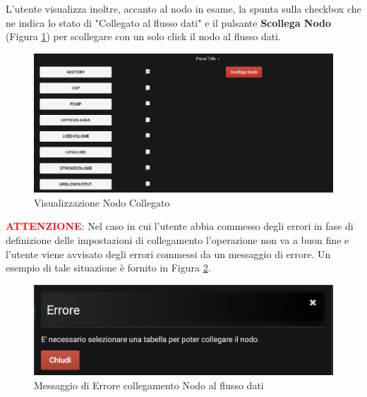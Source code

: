 L'utente visualizza inoltre, accanto al nodo in esame, la spunta sulla checkbox che ne indica lo stato di "Collegato al flusso dati" e il pulsante \textbf{Scollega Nodo} (Figura \ref{NodoCollegato}) per scollegare con un solo click il nodo al flusso dati.
 
 \begin{figure}[H]
	\begin{center}
		\includegraphics[scale=0.4]{./images/NodoCollegato.png}
		 \caption{Visualizzazione Nodo Collegato}	
		 \label{NodoCollegato}
	\end{center}
\end{figure}

\textbf{\textcolor{red}{ATTENZIONE}}: Nel caso in cui l'utente abbia commesso degli errori in fase di definizione delle impostazioni di collegamento l'operazione non va a buon fine e l'utente viene avvisato degli errori commessi da un messaggio di errore. Un esempio di tale situazione è fornito in Figura \ref{ErroreCollegamento}.

\begin{figure}[H]
	\begin{center}
		\includegraphics[scale=0.6]{./images/ErroreCollegamento.png}
		 \caption{Messaggio di Errore collegamento Nodo al flusso dati}	
		 \label{ErroreCollegamento}
	\end{center}
\end{figure}
 